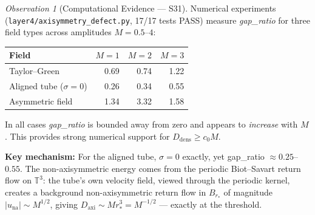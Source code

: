 \documentclass[11pt]{article}
\theoremstyle{definition}
\theoremstyle{remark}
\newtheorem{observation}[theorem]{Observation}
\begin{document}
\begin{observation}[Computational Evidence — S31]\label{obs:gap-ratio}
  Numerical experiments (\texttt{layer4/axisymmetry\_defect.py}, 17/17 tests PASS)
  measure \emph{gap\_ratio} for three field types across amplitudes $M = 0.5$--$4$:
  \begin{center}
  \begin{tabular}{l|rrr}
  \hline
  Field & $M=1$ & $M=2$ & $M=3$\\
  \hline
  Taylor--Green      & 0.69 & 0.74 & 1.22 \\
  Aligned tube ($\sigma=0$) & 0.26 & 0.34 & 0.55 \\
  Asymmetric field   & 1.34 & 3.32 & 1.58 \\
  \hline
  \end{tabular}
  \end{center}
  In all cases \emph{gap\_ratio} is bounded away from zero and appears to
  \emph{increase} with $M$.  This provides strong numerical support for
  $D_{\mathrm{dens}} \ge c_0 M$.

  \textbf{Key mechanism:} For the aligned tube, $\sigma = 0$ exactly,
  yet gap\_ratio $\approx 0.25$--$0.55$.  The non-axisymmetric energy
  comes from the periodic Biot--Savart return flow on $\mathbb{T}^3$:
  the tube's own velocity field, viewed through the periodic kernel,
  creates a background non-axisymmetric return flow in $B_{r_*}$ of
  magnitude $|u_{\mathrm{na}}| \sim M^{1/2}$, giving
  $D_{\mathrm{axi}} \sim M r_*^3 = M^{-1/2}$ — exactly at the threshold.
\end{observation}
\end{document}
